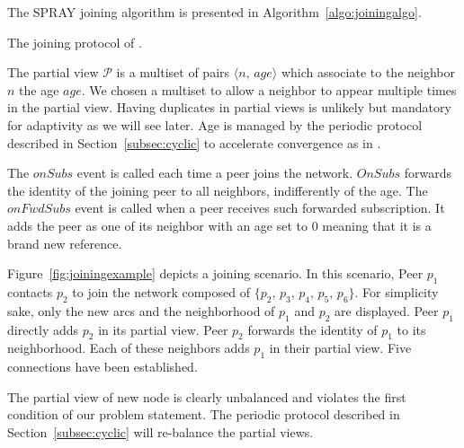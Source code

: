 
The SPRAY{} joining algorithm is presented in
Algorithm~\ref{algo:joiningalgo}.

\begin{algorithm}

\caption{\label{algo:joiningalgo}The joining protocol of \SPRAY{}.}
\end{algorithm}

The partial view $\mathcal{P}$ is a multiset of pairs
$\langle n,\, age\rangle$ which associate to the neighbor $n$ the age
$age$. We chosen a multiset to allow a neighbor to appear multiple
times in the partial view. Having duplicates in partial views is
unlikely but mandatory for adaptivity as we will see later. Age is
managed by the periodic protocol described in
Section~\ref{subsec:cyclic} to accelerate convergence as in
\CYCLON{}. 

The $onSubs$ event is called each time a peer joins the
network. $OnSubs$ forwards the identity of the joining peer to all
neighbors, indifferently of the age. The $onFwdSubs$ event is called
when a peer receives such forwarded subscription. It adds the peer as
one of its neighbor with an age set to $0$ meaning that it is a brand
new reference.

Figure~\ref{fig:joiningexample} depicts a
joining scenario. In this scenario, Peer $p_1$ contacts $p_2$ to join
the network composed of $\{p_2,\,p_3,\,p_4,\,p_5,\,p_6\}$. For
simplicity sake, only the new arcs and the neighborhood of $p_1$ and
$p_2$ are displayed. Peer $p_1$ directly adds $p_2$ in its partial
view. Peer $p_2$ forwards the identity of $p_1$ to its
neighborhood. Each of these neighbors adds $p_1$ in their partial
view. Five connections have been established.

The partial view of new node is clearly unbalanced and violates the
first condition of our problem statement. The periodic protocol
described in Section~\ref{subsec:cyclic} will re-balance the partial
views.


